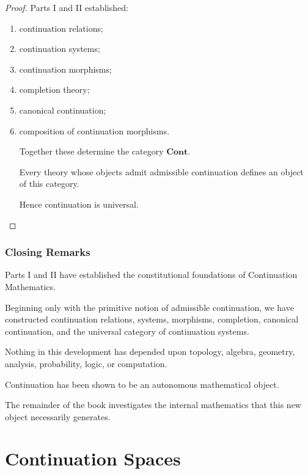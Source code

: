 \documentclass[13pt,openany]{book}
\theoremstyle{plain}
\theoremstyle{definition}
\begin{document}
\begin{proof}

Parts I and II established:

\begin{enumerate}

\item continuation relations;

\item continuation systems;

\item continuation morphisms;

\item completion theory;

\item canonical continuation;

\item composition of continuation morphisms.

Together these determine the category $\mathbf{Cont}$.

Every theory whose objects admit admissible continuation defines an object of
this category.

Hence continuation is universal.

\end{enumerate}

\end{proof}


\section*{Closing Remarks}

Parts I and II have established the constitutional foundations of Continuation
Mathematics.

Beginning only with the primitive notion of admissible continuation, we have
constructed continuation relations, systems, morphisms, completion, canonical
continuation, and the universal category of continuation systems.

Nothing in this development has depended upon topology, algebra, geometry,
analysis, probability, logic, or computation.

Continuation has been shown to be an autonomous mathematical object.

The remainder of the book investigates the internal mathematics that this new
object necessarily generates.


\part{Continuation Spaces}
\end{document}
